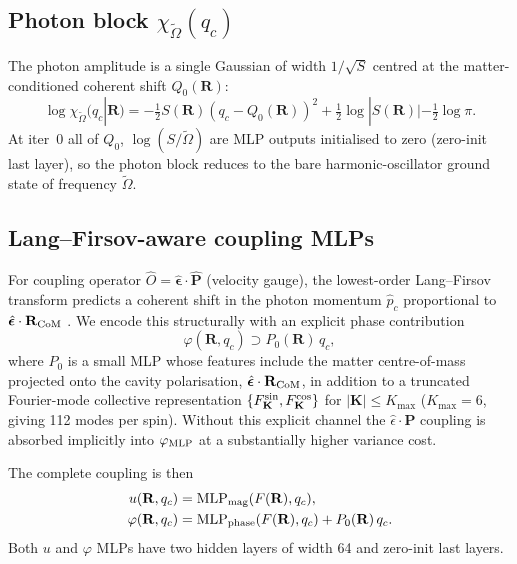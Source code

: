 \documentclass[reprint,amsmath,amssymb,aps,prb,floatfix,nofootinbib]{revtex4-2}
\newcommand{\Oeff}{\widetilde{\Omega}}
\begin{document}
\subsection{Photon block $\chi_{\Oeff}(q_c)$}
The photon amplitude is a single Gaussian of width $1/\sqrt{S}$
centred at the matter-conditioned coherent shift $Q_0(\mathbf{R})$:
\begin{equation}
\log \chi_{\Oeff}(q_c|\mathbf{R}) =
  -\tfrac12 S(\mathbf{R})(q_c - Q_0(\mathbf{R}))^2
  + \tfrac12 \log |S(\mathbf{R})| - \tfrac12 \log \pi.
\label{eq:chi}
\end{equation}
At iter~0 all of $Q_0$, $\log(S/\Oeff)$ are MLP outputs initialised
to zero (zero-init last layer), so the photon block reduces to the
bare harmonic-oscillator ground state of frequency $\Oeff$.

\subsection{Lang--Firsov-aware coupling MLPs}\label{sec:lf-mlps}
For coupling operator $\hat O = \hat{\bm\epsilon}\cdot\hat{\mathbf{P}}$
(velocity gauge), the lowest-order Lang--Firsov transform predicts
a coherent shift in the photon momentum $\hat p_c$ proportional to
$\hat{\bm\epsilon}\cdot\mathbf{R}_{\rm CoM}$ \cite{Schaefer2018}.  We
encode this structurally with an explicit phase contribution
\begin{equation}
\varphi(\mathbf{R}, q_c) \supset P_0(\mathbf{R})\, q_c,
\end{equation}
where $P_0$ is a small MLP whose features include the matter
centre-of-mass projected onto the cavity polarisation,
$\hat{\bm\epsilon}\cdot \mathbf{R}_{\rm CoM}$, in addition to a
truncated Fourier-mode collective representation
$\{F^{\rm sin}_{\mathbf{K}}, F^{\rm cos}_{\mathbf{K}}\}$ for
$|\mathbf{K}| \le K_{\max}$ ($K_{\max} = 6$, giving 112 modes per
spin).  Without this explicit channel the
$\hat\epsilon \cdot \mathbf{P}$ coupling is absorbed implicitly into
$\varphi_{\rm MLP}$ at a substantially higher variance cost.

The complete coupling is then
\begin{align}
u(\mathbf{R}, q_c) &= \mathrm{MLP}_{\rm mag}(F(\mathbf{R}), q_c), \\
\varphi(\mathbf{R}, q_c) &= \mathrm{MLP}_{\rm phase}(F(\mathbf{R}), q_c)
                          + P_0(\mathbf{R})\, q_c.
\end{align}
Both $u$ and $\varphi$ MLPs have two hidden layers of width 64 and
zero-init last layers.
\end{document}
